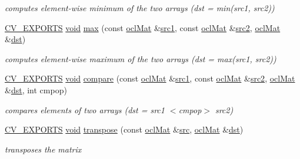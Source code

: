 \begin{DoxyCompactItemize}
\begin{DoxyCompactList}\small\item\em computes element-\/wise minimum of the two arrays (dst = min(src1, src2)) \end{DoxyCompactList}\item 
\hyperlink{core_2types__c_8h_a1bf9f0e121b54272da02379cfccd0a2b}{C\-V\-\_\-\-E\-X\-P\-O\-R\-T\-S} \hyperlink{legacy_8hpp_a8bb47f092d473522721002c86c13b94e}{void} \hyperlink{namespacecv_1_1ocl_ad433812b5d92f66aa0e97d7a07982e48}{max} (const \hyperlink{classcv_1_1ocl_1_1oclMat}{ocl\-Mat} \&\hyperlink{core__c_8h_a897de4702c922f4cccda0d57ccdcafb3}{src1}, const \hyperlink{classcv_1_1ocl_1_1oclMat}{ocl\-Mat} \&\hyperlink{core__c_8h_a7561a36d48069d54a6c8ac4e4750edfd}{src2}, \hyperlink{classcv_1_1ocl_1_1oclMat}{ocl\-Mat} \&\hyperlink{photo__c_8h_aed13e2a25279b24dc954073233fef7a5}{dst})
\begin{DoxyCompactList}\small\item\em computes element-\/wise maximum of the two arrays (dst = max(src1, src2)) \end{DoxyCompactList}\item 
\hyperlink{core_2types__c_8h_a1bf9f0e121b54272da02379cfccd0a2b}{C\-V\-\_\-\-E\-X\-P\-O\-R\-T\-S} \hyperlink{legacy_8hpp_a8bb47f092d473522721002c86c13b94e}{void} \hyperlink{namespacecv_1_1ocl_a88248f8b1ff163246566807d620159c3}{compare} (const \hyperlink{classcv_1_1ocl_1_1oclMat}{ocl\-Mat} \&\hyperlink{core__c_8h_a897de4702c922f4cccda0d57ccdcafb3}{src1}, const \hyperlink{classcv_1_1ocl_1_1oclMat}{ocl\-Mat} \&\hyperlink{core__c_8h_a7561a36d48069d54a6c8ac4e4750edfd}{src2}, \hyperlink{classcv_1_1ocl_1_1oclMat}{ocl\-Mat} \&\hyperlink{photo__c_8h_aed13e2a25279b24dc954073233fef7a5}{dst}, int cmpop)
\begin{DoxyCompactList}\small\item\em compares elements of two arrays (dst = src1 $<$cmpop$>$ src2) \end{DoxyCompactList}\item 
\hyperlink{core_2types__c_8h_a1bf9f0e121b54272da02379cfccd0a2b}{C\-V\-\_\-\-E\-X\-P\-O\-R\-T\-S} \hyperlink{legacy_8hpp_a8bb47f092d473522721002c86c13b94e}{void} \hyperlink{namespacecv_1_1ocl_ad2c13b57eae9da928057e73fdc25b9d6}{transpose} (const \hyperlink{classcv_1_1ocl_1_1oclMat}{ocl\-Mat} \&\hyperlink{legacy_8hpp_a371cd109b74033bc4366f584edd3dacc}{src}, \hyperlink{classcv_1_1ocl_1_1oclMat}{ocl\-Mat} \&\hyperlink{photo__c_8h_aed13e2a25279b24dc954073233fef7a5}{dst})
\begin{DoxyCompactList}\small\item\em transposes the matrix \end{DoxyCompactList}\item 

\end{DoxyCompactItemize}
